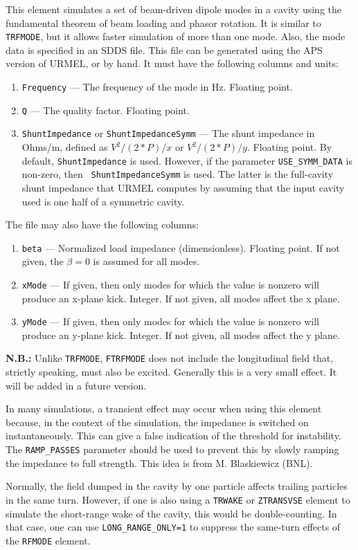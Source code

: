 This element simulates a set of beam-driven dipole modes in a cavity using the fundamental theorem of beam loading and phasor rotation.
It is similar to {\tt TRFMODE}, but it allows faster simulation of more than
one mode.  Also, the mode data is specified in an SDDS file.  This file can be
generated using the APS version of URMEL, or by hand. It must have the following
columns and units:
\begin{enumerate}
\item {\tt Frequency} --- The frequency of the mode in Hz.  Floating point.
\item {\tt Q} --- The quality factor.  Floating point.
\item {\tt ShuntImpedance} or {\tt ShuntImpedanceSymm} --- The shunt
  impedance in Ohms/m, defined as $V^2/(2*P)/x$ or $V^2/(2*P)/y$.
  Floating point. By default, {\tt ShuntImpedance} is used.  However,
  if the parameter \verb|USE_SYMM_DATA| is non-zero, then {\tt
  ShuntImpedanceSymm} is used.  The latter is the full-cavity shunt
  impedance that URMEL computes by assuming that the input cavity used
  is one half of a symmetric cavity.
\end{enumerate}

The file may also have the following columns:
\begin{enumerate}
\item {\tt beta} --- Normalized load impedance (dimensionless).  Floating point. If not given, the
 $\beta=0$ is assumed for all modes. 
\item {\tt xMode} --- If given, then only modes for which the value is nonzero will produce an
 x-plane kick.  Integer.  If not given, all modes affect the x plane.
\item {\tt yMode} --- If given, then only modes for which the value is nonzero will produce an
 y-plane kick.  Integer.  If not given, all modes affect the y plane.
\end{enumerate}
    
{\bf N.B.:} Unlike {\tt TRFMODE}, {\tt FTRFMODE} does not include the longitudinal field that,
strictly speaking, must also be excited.  Generally this is a very small effect.  It will be
added in a future version.

In many simulations, a transient effect may occur when using this
element because, in the context of the simulation, the impedance is
switched on instantaneously.  This can give a false indication of the
threshold for instability. The {\tt RAMP\_PASSES} parameter should
be used to prevent this by slowly ramping the impedance to full
strength.  This idea is from M. Blaskiewicz (BNL).

Normally, the field dumped in the cavity by one particle affects trailing particles in the same turn.
However, if one is also using a \verb|TRWAKE| or \verb|ZTRANSVSE| element to simulate the short-range wake of the cavity, this would be double-counting.
In that case, one can use \verb|LONG_RANGE_ONLY=1| to suppress the same-turn effects of the \verb|RFMODE| element.
